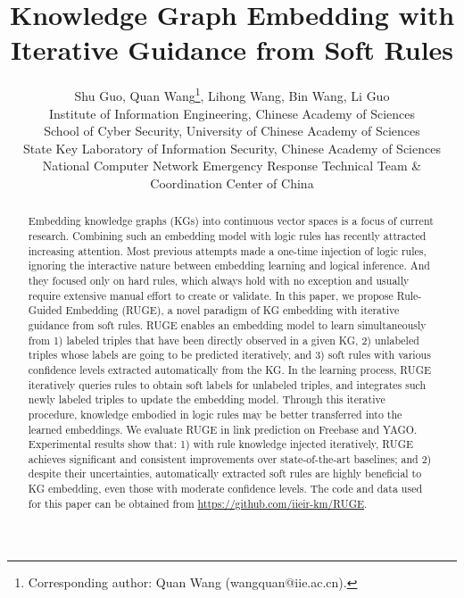 \documentclass[letterpaper]{article} \usepackage{aaai18}  \usepackage{times}  \usepackage{helvet}  \usepackage{courier}  \usepackage{url}  \usepackage{graphicx}  \usepackage{amsmath}
\begin{document}
\title{Knowledge Graph Embedding with Iterative Guidance from Soft Rules}
\author{Shu Guo, Quan Wang\thanks{Corresponding author: Quan Wang (wangquan@iie.ac.cn).}, Lihong Wang, Bin Wang, Li Guo \\
  Institute of Information Engineering, Chinese Academy of Sciences\\
  School of Cyber Security, University of Chinese Academy of Sciences\\
  State Key Laboratory of Information Security, Chinese Academy of Sciences\\
  National Computer Network Emergency Response Technical Team \& Coordination Center of China}
\maketitle
\begin{abstract}
  Embedding knowledge graphs (KGs) into continuous vector spaces is a focus of current research. Combining such an embedding model with logic rules has recently attracted increasing attention. Most previous attempts made a one-time injection of logic rules, ignoring the interactive nature between embedding learning and logical inference. And they focused only on hard rules, which always hold with no exception and usually require extensive manual effort to create or validate. In this paper, we propose Rule-Guided Embedding (RUGE), a novel paradigm of KG embedding with iterative guidance from soft rules. RUGE enables an embedding model to learn simultaneously from 1) labeled triples that have been directly observed in a given KG, 2) unlabeled triples whose labels are going to be predicted iteratively, and 3) soft rules with various confidence levels extracted automatically from the KG. In the learning process, RUGE iteratively queries rules to obtain soft labels for unlabeled triples, and integrates such newly labeled triples to update the embedding model. Through this iterative procedure, knowledge embodied in logic rules may be better transferred into the learned embeddings. We evaluate RUGE in link prediction on Freebase and YAGO. Experimental results show that: 1) with rule knowledge injected iteratively, RUGE achieves significant and consistent improvements over state-of-the-art baselines; and 2) despite their uncertainties, automatically extracted soft rules are highly beneficial to KG embedding, even those with moderate confidence levels. The code and data used for this paper can be obtained from \url{https://github.com/iieir-km/RUGE}.
\end{abstract}
\end{document}

